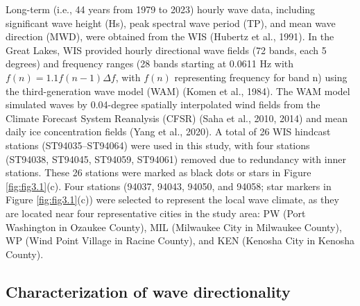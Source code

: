 Long-term (i.e., 44 years from 1979 to 2023) hourly wave data, including significant wave height (Hs), peak spectral wave period (TP), and mean wave direction (MWD), were obtained from the WIS (Hubertz et al., 1991). In the Great Lakes, WIS provided hourly directional wave fields (72 bands, each 5 degrees) and frequency ranges (28 bands starting at 0.0611 Hz with $f(n)=1.1f(n-1)\Delta f$, with $f(n)$ representing frequency for band n) using the third-generation wave model (WAM) (Komen et al., 1984). The WAM model simulated waves by 0.04-degree spatially interpolated wind fields from the Climate Forecast System Reanalysis (CFSR) (Saha et al., 2010, 2014) and mean daily ice concentration fields (Yang et al., 2020). A total of 26 WIS hindcast stations (ST94035–ST94064) were used in this study, with four stations (ST94038, ST94045, ST94059, ST94061) removed due to redundancy with inner stations. These 26 stations were marked as black dots or stars in Figure \ref{fig:fig3.1}(c). Four stations (94037, 94043, 94050, and 94058; star markers in Figure \ref{fig:fig3.1}(c)) were selected to represent the local wave climate, as they are located near four representative cities in the study area: PW (Port Washington in Ozaukee County), MIL (Milwaukee City in Milwaukee County), WP (Wind Point Village in Racine County), and KEN (Kenosha City in Kenosha County).

\subsection{Characterization of wave directionality}

